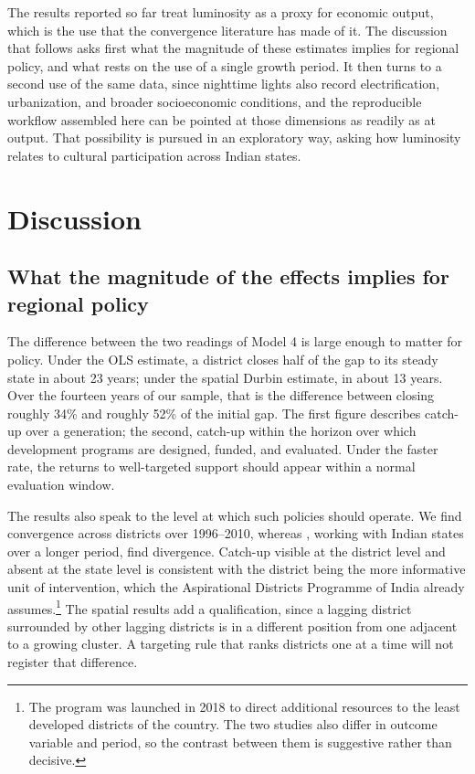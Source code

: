 \documentclass[
  a4paper, 
  twoside,
  final
]{article}
\begin{document}
The results reported so far treat luminosity as a proxy for economic
output, which is the use that the convergence literature has made of it.
The discussion that follows asks first what the magnitude of these
estimates implies for regional policy, and what rests on the use of a
single growth period. It then turns to a second use of the same data,
since nighttime lights also record electrification, urbanization, and
broader socioeconomic conditions, and the reproducible workflow
assembled here can be pointed at those dimensions as readily as at
output. That possibility is pursued in an exploratory way, asking how
luminosity relates to cultural participation across Indian states.

\section{Discussion}\label{discussion}

\subsection{What the magnitude of the effects implies for regional
policy}\label{what-the-magnitude-of-the-effects-implies-for-regional-policy}

The difference between the two readings of Model 4 is large enough to
matter for policy. Under the OLS estimate, a district closes half of the
gap to its steady state in about 23 years; under the spatial Durbin
estimate, in about 13 years. Over the fourteen years of our sample, that
is the difference between closing roughly 34\% and roughly 52\% of the
initial gap. The first figure describes catch-up over a generation; the
second, catch-up within the horizon over which development programs are
designed, funded, and evaluated. Under the faster rate, the returns to
well-targeted support should appear within a normal evaluation window.

The results also speak to the level at which such policies should
operate. We find convergence across districts over 1996--2010, whereas
\citet{lolayekar_mukhopadhyay_india_spatial}, working with Indian states
over a longer period, find divergence. Catch-up visible at the district
level and absent at the state level is consistent with the district
being the more informative unit of intervention, which the Aspirational
Districts Programme of India already assumes.\footnote{The program was
  launched in 2018 to direct additional resources to the least developed
  districts of the country. The two studies also differ in outcome
  variable and period, so the contrast between them is suggestive rather
  than decisive.} The spatial results add a qualification, since a
lagging district surrounded by other lagging districts is in a different
position from one adjacent to a growing cluster. A targeting rule that
ranks districts one at a time will not register that difference.
\end{document}
